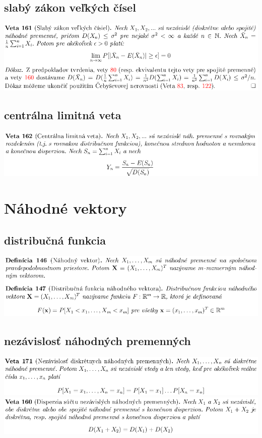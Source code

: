 \subsection {slabý zákon veľkých čísel}
\includegraphics[width=1\textwidth]{images/pravdepodobnost/slaby_zak_velk_cis}\\
\subsection {centrálna limitná veta}
\includegraphics[width=1\textwidth]{images/pravdepodobnost/cent_lim_vet}\\

\section{Náhodné vektory}

\subsection {distribučná funkcia}
\includegraphics[width=1\textwidth]{images/pravdepodobnost/nah_vekt_dist_funk}\\
\subsection {nezávislosť náhodných premenných}
\includegraphics[width=1\textwidth]{images/pravdepodobnost/nezav_nah_prem}\\
\includegraphics[width=1\textwidth]{images/pravdepodobnost/disp_nezav_nah_prem}\\
